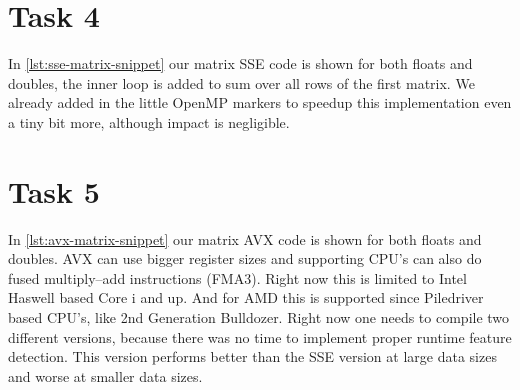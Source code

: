 \documentclass[final]{report}
\begin{document}
\section{Task 4}

In \cref{lst:sse-matrix-snippet} our matrix SSE code is shown for both floats and doubles, the inner loop is added to sum over all rows of the first matrix. We already added in the little OpenMP markers to speedup this implementation even a tiny bit more, although impact is negligible.


\section{Task 5}

In \cref{lst:avx-matrix-snippet} our matrix AVX code is shown for both floats and doubles.
AVX can use bigger register sizes and supporting CPU's can also do fused multiply–add instructions (FMA3).
Right now this is limited to Intel Haswell based Core i and up.
And for AMD this is supported since Piledriver based CPU's, like 2nd Generation Bulldozer. 
Right now one needs to compile two different versions, because there was no time to implement proper runtime feature detection.
This version performs better than the SSE version at large data sizes and worse at smaller data sizes. 

\end{document}
